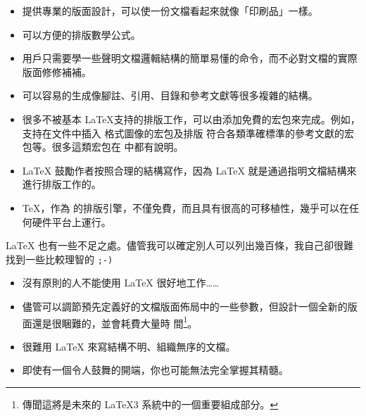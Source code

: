\begin{itemize}

\item 提供專業的版面設計，可以使一份文檔看起來就像「印刷品」一樣。
\item 可以方便的排版數學公式。
\item
用戶只需要學一些聲明文檔邏輯結構的簡單易懂的命令，而不必對文檔的實際版面修修補補。
\item 可以容易的生成像腳註、引用、目錄和參考文獻等很多複雜的結構。
\item 很多不被基本 \LaTeX 支持的排版工作，可以由添加免費的宏包來完成。例如，支持在文件中插入 \PSi{} 格式圖像的宏包及排版
符合各類準確標準的參考文獻的宏包等。很多這類宏包在 \companion 中都有說明。
\item
\LaTeX{} 鼓勵作者按照合理的結構寫作，因為 \LaTeX{} 就是通過指明文檔結構來進行排版工作的。
\item \TeX{}，作為 \LaTeXe 的排版引擎，不僅免費，而且具有很高的可移植性，幾乎可以在任何硬件平台上運行。

%
%
\end{itemize}

\medskip


\noindent\LaTeX{} 也有一些不足之處。儘管我可以確定別人可以列出幾百條，我自己卻很難找到一些比較理智的 \texttt{;-)}


\begin{itemize}
\item 沒有原則的人不能使用 \LaTeX{} 很好地工作……
\item 儘管可以調節預先定義好的文檔版面佈局中的一些參數，但設計一個全新的版面還是很睏難的，並會耗費大量時
間\footnote{傳聞這將是未來的 \LaTeX 3 系統中的一個重要組成部分。}。
\item 很難用 \LaTeX{} 來寫結構不明、組織無序的文檔。
\item 即使有一個令人鼓舞的開端，你也可能無法完全掌握其精髓。
\end{itemize}

